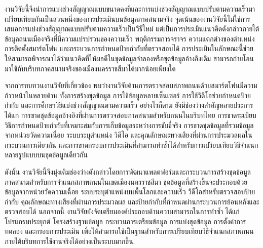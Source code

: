 งานวิจัยนี้จึงนำการแบ่งช่วงสัญญาณแบบขนาดคงที่และการแบ่งช่วงสัญญาณแบบปรับตามความเร็วมาเปรียบเทียบกันเป็นส่วนหนึ่งของการประเมินบนข้อมูลภาคสนามจริง จุดเน้นของงานวิจัยนี้ไม่ใช่การเสนอการแบ่งช่วงสัญญาณแบบปรับตามความเร็วเป็นวิธีใหม่ แต่เป็นการประเมินแนวคิดดังกล่าวภายใต้ข้อมูลถนนเมืองจริงที่มีความแปรปรวนของความเร็ว พฤติกรรมการจราจร ความแตกต่างของตำแหน่งการติดตั้งสมาร์ตโฟน และกระบวนการกำหนดป้ายกำกับที่ตรวจสอบได้ การประเมินในลักษณะนี้ช่วยให้สามารถพิจารณาได้ว่าแนวคิดที่ให้ผลดีในชุดข้อมูลจำลองหรือชุดข้อมูลอ้างอิงเดิม สามารถถ่ายโอนมาใช้กับบริบทภาคสนามจริงของเมืองนครราชสีมาได้มากน้อยเพียงใด

จากการทบทวนงานวิจัยที่เกี่ยวข้อง พบว่างานวิจัยด้านการตรวจสอบสภาพถนนด้วยสมาร์ตโฟนมีความก้าวหน้าในหลายด้าน ทั้งการสร้างชุดข้อมูล การใช้ข้อมูลหลายเซ็นเซอร์ การใช้วิดีโอช่วยกำหนดป้ายกำกับ และการศึกษาวิธีแบ่งช่วงสัญญาณตามความเร็ว อย่างไรก็ตาม ยังมีช่องว่างสำคัญหลายประการ ได้แก่ การขาดชุดข้อมูลอ้างอิงที่ผ่านการตรวจสอบภาคสนามสำหรับถนนในบริบทไทย การขาดระเบียบวิธีการกำหนดป้ายกำกับที่เหมาะสมกับการเก็บข้อมูลระหว่างการขับขี่จริง การขาดชุดข้อมูลที่รวมข้อมูลจากหน่วยวัดความเฉื่อย ระบบระบุตำแหน่ง วิดีโอ และคุณลักษณะทางเสียงที่ผ่านการประมวลผลในกระบวนการเดียวกัน และการขาดกรอบการประเมินที่สามารถทำซ้ำได้สำหรับการเปรียบเทียบวิธีจำแนกหลายรูปแบบบนชุดข้อมูลเดียวกัน

ดังนั้น งานวิจัยนี้จึงมุ่งเติมช่องว่างดังกล่าวโดยการพัฒนาแพลตฟอร์มและกระบวนการสร้างชุดข้อมูลภาคสนามสำหรับการจำแนกสภาพถนนในเขตเมืองนครราชสีมา ชุดข้อมูลที่สร้างขึ้นจะประกอบด้วยข้อมูลจากหน่วยวัดความเฉื่อย ระบบระบุตำแหน่งบนพื้นโลกและความเร็ว วิดีโอสำหรับตรวจสอบป้ายกำกับ คุณลักษณะทางเสียงที่ผ่านการประมวลผล และป้ายกำกับที่กำหนดผ่านกระบวนการย้อนหลังและตรวจสอบได้ นอกจากนี้ งานวิจัยยังจัดเตรียมองค์ประกอบด้านความสามารถในการทำซ้ำ ได้แก่ โปรแกรมประยุกต์ โครงสร้างฐานข้อมูล กระบวนการเตรียมข้อมูล การแบ่งชุดข้อมูล การตั้งค่าการทดลอง และกรอบการประเมิน เพื่อให้สามารถใช้เป็นฐานสำหรับการเปรียบเทียบวิธีจำแนกสภาพถนนภายใต้บริบทการใช้งานจริงได้อย่างเป็นระบบมากขึ้น.

